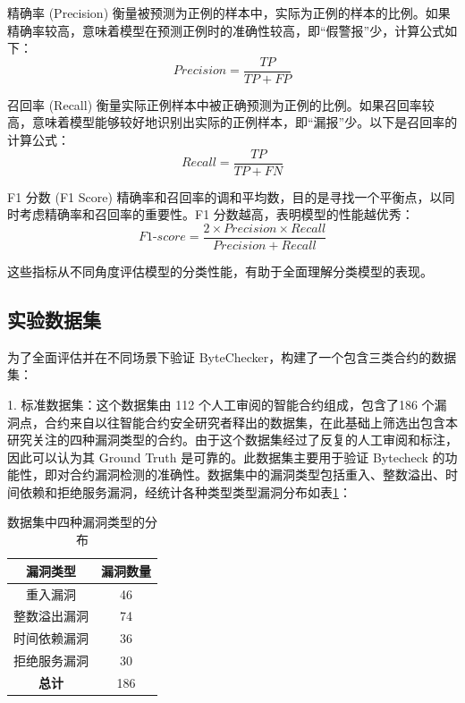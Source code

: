 \documentclass[print, master, vlined, timesmath]{DissertUESTC}
\begin{document}
精确率 (Precision)
衡量被预测为正例的样本中，实际为正例的样本的比例。如果精确率较高，意味着模型在预测正例时的准确性较高，即“假警报”少，计算公式如下：
\begin{equation}
Precision = \frac{TP}{TP + FP}
\end{equation}

召回率 (Recall)
衡量实际正例样本中被正确预测为正例的比例。如果召回率较高，意味着模型能够较好地识别出实际的正例样本，即“漏报”少。以下是召回率的计算公式：
\begin{equation}
Recall = \frac{TP}{TP + FN}
\end{equation}

F1 分数 (F1 Score)
精确率和召回率的调和平均数，目的是寻找一个平衡点，以同时考虑精确率和召回率的重要性。F1 分数越高，表明模型的性能越优秀：
\begin{equation}
F1\text{-}score = \frac{2 \times Precision \times Recall}{Precision + Recall}
\end{equation}

这些指标从不同角度评估模型的分类性能，有助于全面理解分类模型的表现。

\subsection{实验数据集}

为了全面评估并在不同场景下验证 ByteChecker，构建了一个包含三类合约的数据集：

1. 标准数据集：这个数据集由 112 个人工审阅的智能合约组成，包含了186 个漏洞点，合约来自以往智能合约安全研究者释出的数据集，在此基础上筛选出包含本研究关注的四种漏洞类型的合约。由于这个数据集经过了反复的人工审阅和标注，因此可以认为其 Ground Truth 是可靠的。此数据集主要用于验证 Bytecheck 的功能性，即对合约漏洞检测的准确性。数据集中的漏洞类型包括重入、整数溢出、时间依赖和拒绝服务漏洞，经统计各种类型类型漏洞分布如表\ref{tab:vulnerability_distribution}：

\begin{table}[h]
    \centering
    \renewcommand{\arraystretch}{1.3}
    \begin{tabular}{|c|c|}
    \hline
    \textbf{漏洞类型} & \textbf{漏洞数量} \\ \hline
    重入漏洞 & 46 \\ \hline
    整数溢出漏洞 & 74 \\ \hline
    时间依赖漏洞 & 36 \\ \hline
    拒绝服务漏洞 & 30 \\ \hline
    \textbf{总计} & 186 \\ \hline
    \end{tabular}
    \caption{数据集中四种漏洞类型的分布}
    \label{tab:vulnerability_distribution}
\end{table}
    
\end{document}
